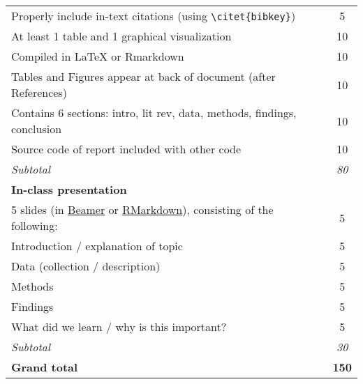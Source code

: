 \documentclass[12pt,english]{article}
\begin{document}
\begin{center}
{\begin{tabular}{l|c|c}
Properly include in-text citations (using \texttt{\textbackslash citet\{bibkey\}})           &               & 5                        \\
At least 1 table and 1 graphical visualization                                               &               & 10                       \\
Compiled in LaTeX or Rmarkdown                                                               &               & 10                       \\
Tables and Figures appear at back of document (after References)                             &               & 10                       \\
Contains 6 sections: intro, lit rev, data, methods, findings, conclusion                     &               & 10                       \\
Source code of report included with other code                                               &               & 10                       \\
\hline
\textit{Subtotal}                                                                            &               & \textit{80}              \\
\hline
\textbf{In-class presentation}                                                               &               &                          \\
5 slides (in \href{https://www.sharelatex.com/learn/Beamer}{Beamer} or \href{https://rmarkdown.rstudio.com/lesson-11.html}{RMarkdown}), consisting of the following: & & 5 \\
Introduction / explanation of topic                                                          &               & 5                        \\
Data (collection / description)                                                              &               & 5                        \\
Methods                                                                                      &               & 5                        \\
Findings                                                                                     &               & 5                        \\
What did we learn / why is this important?                                                   &               & 5                        \\
\hline
\textit{Subtotal}                                                                            &               & \textit{30}              \\
\hline
\textbf{Grand total}                                                                         &               & \textbf{150}            \\
\hline
\end{tabular}
}
\end{center}

\end{document}

